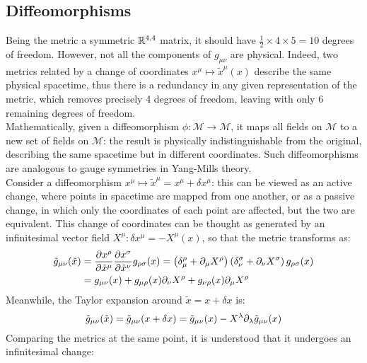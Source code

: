 \subsection{Diffeomorphisms}

Being the metric a symmetric $ \mathbb{R}^{4,4} $ matrix, it should have $ \frac{1}{2} \times 4 \times 5 = 10 $ degrees of freedom. However, not all the components of $ g_{\mu \nu} $ are physical. Indeed, two metrics related by a change of coordinates $ x^\mu \mapsto \tilde{x}^\mu(x) $ describe the same physical spacetime, thus there is a redundancy in any given representation of the metric, which removes precisely 4 degrees of freedom, leaving with only 6 remaining degrees of freedom.\\
Mathematically, given a diffeomorphism $ \phi : \mathcal{M} \rightarrow \mathcal{M} $, it maps all fields on $ \mathcal{M} $ to a new set of fields on $ \mathcal{M} $: the result is physically indistinguishable from the original, describing the same spacetime but in different coordinates. Such diffeomorphisms are analogous to gauge symmetries in Yang-Mills theory.\\
Consider a diffeomorphism $ x^\mu \mapsto \tilde{x}^\mu = x^\mu + \delta x^\mu $: this can be viewed as an active change, where points in spacetime are mapped from one another, or as a passive change, in which only the coordinates of each point are affected, but the two are equivalent. This change of coordinates can be thought as generated by an infinitesimal vector field $ X^\mu : \delta x^\mu = - X^\mu (x) $, so that the metric transforms as:
\begin{equation*}
  \begin{split}
    \tilde{g}_{\mu \nu} (\tilde{x})
    &= \frac{\partial x^\rho}{\partial \tilde{x}^\mu} \frac{\partial x^\sigma}{\partial \tilde{x}^\nu} g_{\rho \sigma}(x) = \left( \delta^\rho_\mu + \partial_\mu X^\rho \right) \left( \delta^\sigma_\nu + \partial_\nu X^\sigma \right) g_{\rho \sigma}(x) \\
    &= g_{\mu \nu}(x) + g_{\mu \rho}(x) \partial_\nu X^\rho + g_{\nu \rho}(x) \partial_\mu X^\rho
  \end{split}
\end{equation*}
Meanwhile, the Taylor expansion around $ \tilde{x} = x + \delta x $ is:
\begin{equation*}
  \tilde{g}_{\mu \nu} (\tilde{x}) = \tilde{g}_{\mu \nu} (x + \delta x) = \tilde{g}_{\mu \nu}(x) - X^\lambda \partial_\lambda \tilde{g}_{\mu \nu}(x)
\end{equation*}
Comparing the metrics at the same point, it is understood that it undergoes an infinitesimal change:

